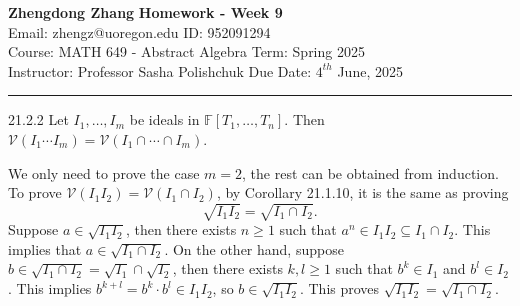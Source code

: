 \documentclass[letterpaper, 12pt]{article}
\begin{document}
\noindent
\large\textbf{Zhengdong Zhang} \hfill \textbf{Homework - Week 9} \\
Email: zhengz@uoregon.edu \hfill ID: 952091294 \\
\normalsize Course: MATH 649 - Abstract Algebra \hfill Term: Spring 2025 \\
Instructor: Professor Sasha Polishchuk \hfill Due Date: $4^{th}$ June, 2025 \\
\noindent\rule{7in}{2.8pt}
\begin{problem}{21.2.2}
Let \(I_1,\ldots,I_m\) be ideals in \(\mathbb{F}[T_1,\ldots,T_n]\). Then \(\mathcal{V}(I_1\cdots I_m)=\mathcal{V}(I_1\cap\cdots\cap I_m)\).
\end{problem}
\begin{solution}
We only need to prove the case \(m=2\), the rest can be obtained from induction. To prove \(\mathcal{V}(I_1I_2)=\mathcal{V}(I_1\cap I_2)\), by Corollary 21.1.10, it is the same as proving 
\[\sqrt{I_1I_2}=\sqrt{I_1\cap I_2}.\]
Suppose \(a\in \sqrt{I_1I_2}\), then there exists \(n\geq 1\) such that \(a^n\in I_1I_2\subseteq I_1\cap I_2\). This implies that \(a\in \sqrt{I_1\cap I_2}\). On the other hand, suppose \(b\in \sqrt{I_1\cap I_2}=\sqrt{I_1}\cap \sqrt{I_2}\), then there exists \(k,l\geq 1\) such that \(b^k\in I_1\) and \(b^l\in I_2\). This implies \(b^{k+l}=b^k\cdot b^l\in I_1I_2\), so \(b\in \sqrt{I_1I_2}\). This proves \(\sqrt{I_1I_2}=\sqrt{I_1\cap I_2}\). 
\end{solution}
\end{document}
